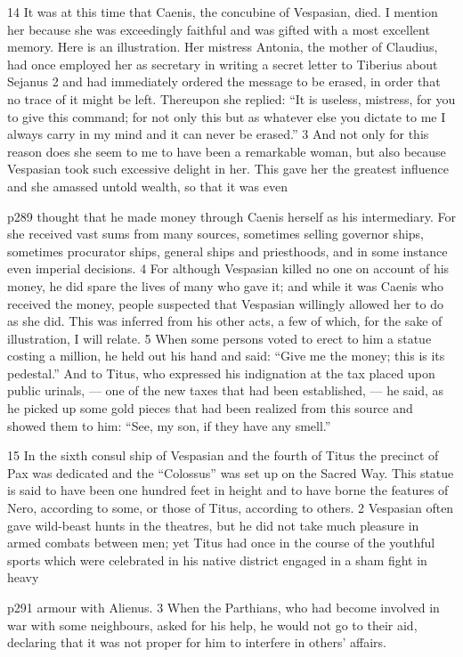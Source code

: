14
It was at this time that Caenis, the concubine of Vespasian, died. I mention her because she was exceedingly faithful and was gifted with a most excellent memory. Here is an illustration. Her mistress Antonia, the mother of Claudius, had once employed her as secretary in writing a secret letter to Tiberius about Sejanus 2 and had immediately ordered the message to be erased, in order that no trace of it might be left. Thereupon she replied: ``It is useless, mistress, for you to give this command; for not only this but as whatever else you dictate to me I always carry in my mind and it can never be erased.'' 3 And not only for this reason does she seem to me to have been a remarkable woman, but also because Vespasian took such excessive delight in her. This gave her the greatest influence and she amassed untold wealth, so that it was even

p289 thought that he made money through Caenis herself as his intermediary. For she received vast sums from many sources, sometimes selling governor ­ships, sometimes procurator ­ships, general ­ships and priesthoods, and in some instance even imperial decisions. 4 For although Vespasian killed no one on account of his money, he did spare the lives of many who gave it; and while it was Caenis who received the money, people suspected that Vespasian willingly allowed her to do as she did. This was inferred from his other acts, a few of which, for the sake of illustration, I will relate. 5 When some persons voted to erect to him a statue costing a million, he held out his hand and said: ``Give me the money; this is its pedestal.'' And to Titus, who expressed his indignation at the tax placed upon public urinals, \texthebrew{—} one of the new taxes that had been established, \texthebrew{—} he said, as he picked up some gold pieces that had been realized from this source and showed them to him: ``See, my son, if they have any smell.''

15
In the sixth consul ­ship of Vespasian and the fourth of Titus the precinct of Pax was dedicated and the ``Colossus'' was set up on the Sacred Way. This statue is said to have been one hundred feet in height and to have borne the features of Nero, according to some, or those of Titus, according to others. 2 Vespasian often gave wild-beast hunts in the theatres, but he did not take much pleasure in armed combats between men; yet Titus had once in the course of the youthful sports which were celebrated in his native district engaged in a sham fight in heavy

p291 armour with Alienus. 3 When the Parthians, who had become involved in war with some neighbours, asked for his help, he would not go to their aid, declaring that it was not proper for him to interfere in others' affairs.

